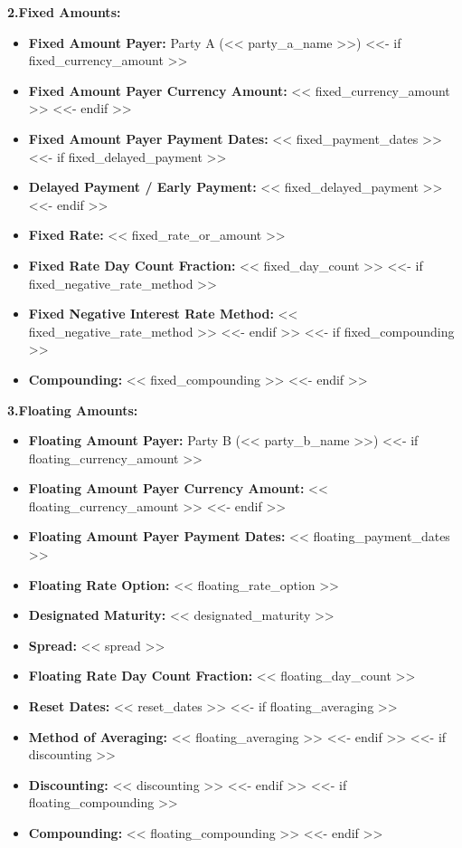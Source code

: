 \documentclass[11pt, a4paper]{article}
\begin{document}
\vspace{0.3cm}
\noindent \textbf{2.\quad Fixed Amounts:}
\begin{itemize}[leftmargin=2cm, label={}, itemsep=3pt]
    \item \textbf{Fixed Amount Payer:} Party A (<< party_a_name >>)
<<- if fixed_currency_amount >>
    \item \textbf{Fixed Amount Payer Currency Amount:} << fixed_currency_amount >>
<<- endif >>
    \item \textbf{Fixed Amount Payer Payment Dates:} << fixed_payment_dates >>
<<- if fixed_delayed_payment >>
    \item \textbf{Delayed Payment / Early Payment:} << fixed_delayed_payment >>
<<- endif >>
    \item \textbf{Fixed Rate:} << fixed_rate_or_amount >>
    \item \textbf{Fixed Rate Day Count Fraction:} << fixed_day_count >>
<<- if fixed_negative_rate_method >>
    \item \textbf{Fixed Negative Interest Rate Method:} << fixed_negative_rate_method >>
<<- endif >>
<<- if fixed_compounding >>
    \item \textbf{Compounding:} << fixed_compounding >>
<<- endif >>
\end{itemize}

\vspace{0.3cm}
\noindent \textbf{3.\quad Floating Amounts:}
\begin{itemize}[leftmargin=2cm, label={}, itemsep=3pt]
    \item \textbf{Floating Amount Payer:} Party B (<< party_b_name >>)
<<- if floating_currency_amount >>
    \item \textbf{Floating Amount Payer Currency Amount:} << floating_currency_amount >>
<<- endif >>
    \item \textbf{Floating Amount Payer Payment Dates:} << floating_payment_dates >>
    \item \textbf{Floating Rate Option:} << floating_rate_option >>
    \item \textbf{Designated Maturity:} << designated_maturity >>
    \item \textbf{Spread:} << spread >>
    \item \textbf{Floating Rate Day Count Fraction:} << floating_day_count >>
    \item \textbf{Reset Dates:} << reset_dates >>
<<- if floating_averaging >>
    \item \textbf{Method of Averaging:} << floating_averaging >>
<<- endif >>
<<- if discounting >>
    \item \textbf{Discounting:} << discounting >>
<<- endif >>
<<- if floating_compounding >>
    \item \textbf{Compounding:} << floating_compounding >>
<<- endif >>
\end{itemize}
\end{document}
